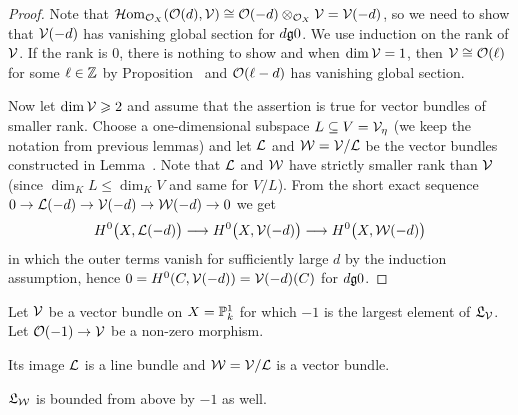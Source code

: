 \documentclass[a4paper,parskip=half,numbers=enddot, DIV=12]{scrreprt}
\renewcommand{\leq}{\leqslant}
\renewcommand{\geq}{\geqslant}
\begin{document}
\begin{proof}
	Note that $\operatorname{\mathcal{H} om}_{\mathcal{O}_X}(\mathcal{O}(d),\mathcal{V})\cong \mathcal{O}(-d)\otimes_{\mathcal{O}_X}\mathcal{V}=\mathcal{V}(-d)$, so we need to show that $\mathcal{V}(-d)$ has vanishing global section for $d\gge 0$. We use induction on the rank of $\mathcal{V}$. If the rank is $0$, there is nothing to show and when $\dim\mathcal{V}=1$, then $\mathcal{V}\cong \mathcal{O}(\ell)$ for some $\ell\in\mathbb{Z}$ by Proposition~ and $\mathcal{O}(\ell-d)$ has vanishing global section. 
	
	Now let $\dim \Vv\geq 2$ and assume that the assertion is true for vector bundles of smaller rank. Choose a one-dimensional subspace $L\subseteq V=\mathcal{V}_\eta$ (we keep the notation from previous lemmas) and let $\mathcal{L}$ and $\mathcal{W}=\mathcal{V}/\mathcal{L}$ be the vector bundles constructed in Lemma~. Note that $\mathcal{L}$ and $\mathcal{W}$ have strictly smaller rank than $\mathcal{V}$ (since $\dim_KL\leq\dim_KV$ and same for $V/L$). From the short exact sequence $0\morphism \Ll(-d)\morphism\Vv(-d)\morphism\Ww(-d)\morphism 0$ we get
	\begin{align*}
		H^0\big(X,\Ll(-d)\big)\morphism H^0\big(X,\Vv(-d)\big)\morphism H^0\big(X,\Ww(-d)\big)
	\end{align*}
	in which the outer terms vanish for sufficiently large $d$ by the induction assumption, hence $0=H^0(C,\mathcal{V}(-d))=\mathcal{V}(-d)(C)$ for $d\gge 0$.
\end{proof}
\begin{lem}
	Let $\mathcal{V}$ be a vector bundle on $X=\mathbb{P}_k^1$ for which $-1$ is the largest element of $\mathfrak{L}_{\mathcal{V}}$. Let $\Oo(-1)\morphism \Vv$ be a non-zero morphism. 
	\begin{alphanumerate}
		\item Its image $\mathcal{L}$ is a line bundle and $\mathcal{W}=\mathcal{V}/\mathcal{L}$ is a vector bundle.
		\item $\mathfrak{L}_{\mathcal{W}}$ is bounded from above by $-1$ as well.
	\end{alphanumerate}
\end{lem}
\end{document}
